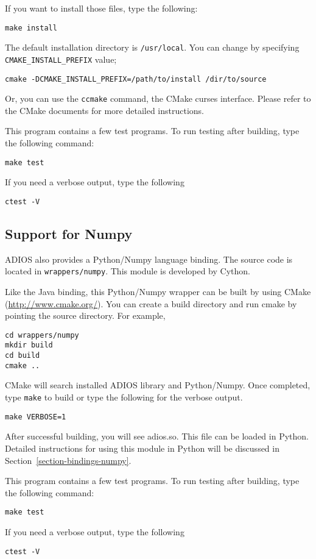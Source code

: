 If you want to install those files, type the following:
\begin{lstlisting}
make install
\end{lstlisting}

The default installation directory is \verb+/usr/local+. You can change by
specifying \verb+CMAKE_INSTALL_PREFIX+ value;
\begin{lstlisting}
cmake -DCMAKE_INSTALL_PREFIX=/path/to/install /dir/to/source
\end{lstlisting}

Or, you can use the \verb+ccmake+ command, the CMake curses interface. Please refer to the CMake documents for more detailed instructions.

This program contains a few test programs. To run testing after building,
type the following command:
\begin{lstlisting}
make test
\end{lstlisting}

If you need a verbose output, type the following
\begin{lstlisting}
ctest -V
\end{lstlisting}

\subsection{Support for Numpy}
\label{section-install-numpy}

ADIOS also provides a Python/Numpy language binding. The source code is located in \verb+wrappers/numpy+. This module is developed by Cython.

Like the Java binding, this Python/Numpy wrapper can be built by using CMake (\url{http://www.cmake.org/}). You can create a build directory and run cmake by pointing the source directory. For example, 
\begin{lstlisting}
cd wrappers/numpy
mkdir build
cd build
cmake ..
\end{lstlisting}

CMake will search installed ADIOS library and Python/Numpy. Once completed, type \verb+make+ to build or type the following for the verbose output.
\begin{lstlisting}
make VERBOSE=1
\end{lstlisting}

After successful building, you will see adios.so. This file can be
loaded in Python. Detailed instructions for using this module in Python will be discussed in Section~\ref{section-bindings-numpy}.

This program contains a few test programs. To run testing after building,
type the following command:
\begin{lstlisting}
make test
\end{lstlisting}

If you need a verbose output, type the following
\begin{lstlisting}
ctest -V
\end{lstlisting}


